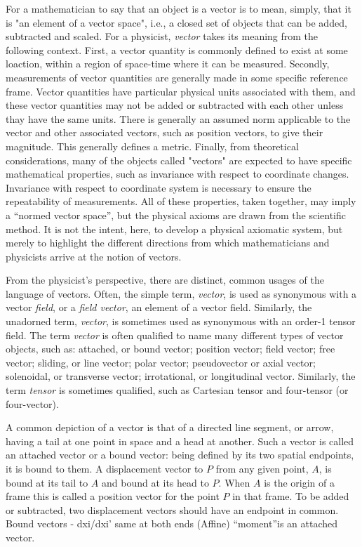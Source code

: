 \documentclass{llncs}
\begin{document}
For a mathematician to say that an object is a vector is to mean,
simply, that it is "an element of a vector space", i.e., a closed set
of objects that can be added, subtracted and scaled.
For a physicist, {\em vector} takes its meaning from the following
context.
First, a vector quantity is commonly defined to exist at some
loaction, within a region of space-time where it can be measured.
Secondly, measurements of vector quantities are generally made in some
specific reference frame.
Vector quantities have particular physical units associated with them,
and these vector quantities may not be added or subtracted with each
other unless thay have the same units.
There is generally an assumed norm applicable to the vector and other
associated vectors, such as position vectors, to give their magnitude.
This generally defines a metric.
Finally, from theoretical considerations, many of the objects called
"vectors" are expected to have specific mathematical properties, such
as invariance with respect to coordinate changes.
Invariance with respect to coordinate system is necessary to ensure
the repeatability of measurements.
All of these properties, taken together, may imply a ``normed vector
space'', but the physical axioms are drawn from the scientific method. 
It is not the intent, here, to develop a physical axiomatic system,
but merely to highlight the different directions from which
mathematicians and physicists arrive at the notion of vectors.

From the physicist's perspective, there are distinct, common usages of
the language of vectors.
Often, the simple term, {\em vector}, is used as synonymous with a
vector {\em field}, or a {\em field vector}, an element of a vector
field.
Similarly, the unadorned term, {\em vector}, is sometimes used as
synonymous with an order-1 tensor field.
The term {\em vector} is often qualified to name many different types
of vector objects, such as: attached, or bound vector; position
vector; field vector; free vector; sliding, or line vector; polar vector;
pseudovector or axial vector; solenoidal, or transverse vector;
irrotational, or longitudinal vector.
Similarly, the term {\em tensor} is sometimes qualified, such as
Cartesian tensor and four-tensor (or four-vector).


A common depiction of a vector is that of a directed line segment, or
arrow, having a tail at one point in space and a head at another.
Such a vector is called an attached vector or a bound vector: being
defined by its two spatial endpoints, it is bound to them.
A displacement vector to $P$ from any given point, $A$, is bound at
its tail to $A$ and bound at its head to $P$.
When $A$ is the origin of a frame this is called a position vector for
the point $P$ in that frame.
To be added or subtracted, two displacement vectors should have an
endpoint in common.
Bound vectors
 - dxi/dxi'
same at both ends (Affine) ``moment''is an attached vector.
\end{document}
